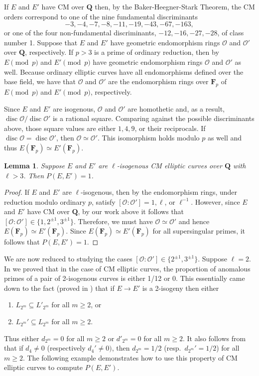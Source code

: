 \documentclass{amsart}
\newcommand{\F}{\mathbf{F}}
\newcommand{\Q}{\mathbf{Q}}
\newcommand{\disc}{\operatorname{disc}}
\numberwithin{equation}{section}
\theoremstyle{plain}
\newtheorem{lem}[equation]{Lemma}
\theoremstyle{remark}
\begin{document}
 If $E$ and $E'$ have CM over $\Q$ then, by the Baker-Heegner-Stark Theorem, the CM orders correspond to one of the nine fundamental discriminants 
\[
-3,-4,-7,-8,-11,-19,-43,-67,-163,
\]
or one of the four non-fundamental discriminants, $-12,-16,-27,-28 $, of class number 1.  Suppose that $E$ and $E'$ have geometric endomorphism rings $\mathcal{O}$ and $\mathcal{O}'$ over $\Q$, respectively.  If $p > 3$ is a prime of ordinary reduction, then by \cite[Ch. 13, Thm. 12]{lang} $E \pmod{p}$ and $E' \pmod{p}$ have geometric endomorphism rings $\mathcal{O}$ and $\mathcal{O}'$ as well.  Because ordinary elliptic curves have all endomorphisms defined over the base field, we have that $\mathcal{O}$ and $\mathcal{O}'$ are the endomorphism rings over $\F_p$ of $E \pmod{p}$ and $E' \pmod{p}$, respectively. 

Since $E$ and $E'$ are isogenous, $\mathcal{O}$ and $\mathcal{O}'$ are homothetic and, as a result, $\disc \mathcal{O} / \disc \mathcal{O}'$ is a rational square.  Comparing against the possible discriminants above, those square values are either $1, 4, 9$, or their reciprocals.  If $\disc \mathcal{O} = \disc \mathcal{O}'$, then $\mathcal{O} \simeq \mathcal{O}'$.  This isomorphism holds modulo $p$ as well and thus $E(\F_p) \simeq E'(\F_p)$. 

\begin{lem}
Suppose $E$ and $E'$ are $\ell$-isogenous CM elliptic curves over $\Q$ with $\ell >3$.  Then $P(E,E') =1$.
\end{lem}

\begin{proof}
If $E$ and $E'$ are $\ell$-isogenous, then by \cite[Prop.~21]{kohel} the endomorphism rings, under reduction modulo ordinary $p$, satisfy $[\mathcal{O}:\mathcal{O}'] = 1,\ell$, or $\ell^{-1}$.  However, since $E$ and $E'$ have CM over $\Q$, by our work above it follows that $[\mathcal{O}: \mathcal{O}'] \in \lbrace 1,2^{\pm 1},3^{\pm 1} \rbrace$.  Therefore, we must have $\mathcal{O} \simeq \mathcal{O}'$ and hence $E(\F_p) \simeq E'(\F_p)$.  Since $E(\F_p) \simeq E'(\F_p)$ for all supersingular primes, it  follows that $P(E,E') =1$.
\end{proof}

We are now reduced to studying the cases $[\mathcal{O}:\mathcal{O}'] \in \lbrace 2^{\pm 1}, 3^{\pm 1} \rbrace$.  Suppose $\ell = 2$.  In \cite{rnt} we proved that in the case of CM elliptic curves, the proportion of anomalous primes of a pair of 2-isogenous curves is either 1/12 or 0.  This essentially came down to the fact (proved in  \cite[Prop.~6.1]{rnt}) that if $E \to E'$ is a 2-isogeny then either 
\begin{enumerate}
\item $L_{2^m} \subseteq L'_{2^m}$  for all $m \geq 2$, or 
\item $L_{2^m}' \subseteq L_{2^m}$  for all $m \geq 2$.
\end{enumerate}
Thus either $d_{2^m} = 0$ for all $m\geq 2$ or $d'_{2^m}=0$ for all $m \geq 2$.   It also follows from \cite[Prop.~6.1]{rnt} that if $d_{4} \ne 0$ (respectively $d_{4}' \ne 0)$, then $d_{2^m} = 1/2$ (resp.~$d_{2^m}' = 1/2$) for all $m\geq 2$.  The following example demonstrates how to use this property of CM elliptic curves to compute $P(E,E')$. 
\end{document}
